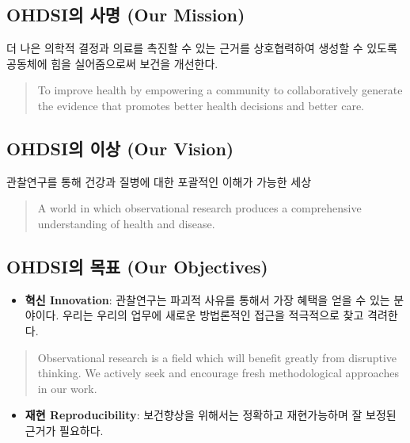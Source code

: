 \documentclass[11pt]{book}
\providecommand{\tightlist}{%
  \setlength{\itemsep}{0pt}\setlength{\parskip}{0pt}}
\theoremstyle{definition}
\theoremstyle{definition}
\theoremstyle{definition}
\theoremstyle{remark}
\begin{document}
\subsection{OHDSI의 사명 (Our Mission)}\label{ohdsi--our-mission}

더 나은 의학적 결정과 의료를 촉진할 수 있는 근거를 상호협력하여 생성할
수 있도록 공동체에 힘을 실어줌으로써 보건을 개선한다.

\begin{quote}
To improve health by empowering a community to collaboratively generate
the evidence that promotes better health decisions and better care.
\end{quote}

\subsection{OHDSI의 이상 (Our Vision)}\label{ohdsi--our-vision}

관찰연구를 통해 건강과 질병에 대한 포괄적인 이해가 가능한 세상

\begin{quote}
A world in which observational research produces a comprehensive
understanding of health and disease. 
\end{quote}

\subsection{OHDSI의 목표 (Our Objectives)}\label{ohdsi--our-objectives}

\begin{itemize}
\tightlist
\item
  \textbf{혁신 Innovation}: 관찰연구는 파괴적 사유를 통해서 가장 혜택을
  얻을 수 있는 분야이다. 우리는 우리의 업무에 새로운 방법론적인 접근을
  적극적으로 찾고 격려한다.
\end{itemize}

\begin{quote}
Observational research is a field which will benefit greatly from
disruptive thinking. We actively seek and encourage fresh methodological
approaches in our work.
\end{quote}

\begin{itemize}
\tightlist
\item
  \textbf{재현 Reproducibility}: 보건향상을 위해서는 정확하고
  재현가능하며 잘 보정된 근거가 필요하다.
\end{itemize}
\end{document}
